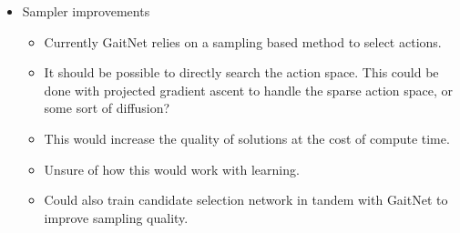 \begin{itemize}
  \item Sampler improvements
    \begin{itemize}
      \item Currently GaitNet relies on a sampling based method
        to select actions.
      \item It should be possible to directly
        search the action space. This could be done with
        projected gradient ascent to handle the sparse action space,
        or some sort of diffusion?
      \item This would increase the quality of solutions at the
        cost of compute time.
      \item Unsure of how this would work with learning.
      \item Could also train candidate selection network in
        tandem with GaitNet to improve sampling quality.
    \end{itemize}
\end{itemize}
